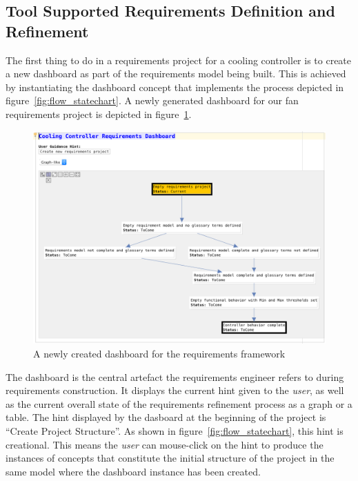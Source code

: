 \subsection*{Tool Supported Requirements Definition and Refinement}
\vspace{-.3cm}
The first thing to do in a requirements project for a cooling controller is to
create a new dashboard as part of the requirements model being built. This is
achieved by instantiating the \textsf{dashboard} concept that implements the
process depicted in figure~\ref{fig:flow_statechart}. A newly generated
dashboard for our fan requirements project is depicted in figure~\ref{fig:empty_dashboard}.
\vspace{-.6cm}
\begin{figure}[!h]
\centering 
\includegraphics[width=.8\textwidth]{./figures/NewDashboard.png}
\caption{A newly created dashboard for the requirements framework}
\label{fig:empty_dashboard}
\vspace{-.6cm}
\end{figure}
The dashboard is the central artefact the requirements engineer refers to during
requirements construction. It displays the current hint given to the
\emph{user}, as well as the current overall state of the requirements refinement
process as a graph or a table. The hint displayed by the dasboard at the
beginning of the project is ``Create Project Structure''. As shown in
figure~\ref{fig:flow_statechart}, this hint is creational. This means the
\emph{user} can mouse-click on the hint to produce the instances of concepts
that constitute the initial structure of the project in the same model where the
dashboard instance has been created.

